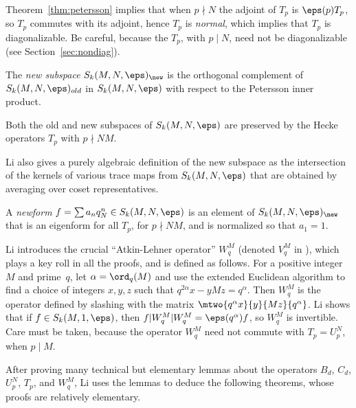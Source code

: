 \documentclass{report}
\begin{document}
\begin{remark}
Theorem~\ref{thm:petersson} implies that when $p\nmid N$ the adjoint of $T_p$
is $\eps(p) T_p$, so $T_p$ commutes with its adjoint, hence
$T_p$ is {\em normal}, which implies that $T_p$ is diagonalizable.
Be careful, because the $T_p$, with $p\mid N$, need not be diagonalizable
(see Section~\ref{sec:nondiag}).
\end{remark}

\begin{definition}
The {\em new subspace} $S_k(M,N,\eps)_{\new}$
is the orthogonal complement of $S_k(M,N,\eps)_{old}$ in $S_k(M,N,\eps)$ with respect
to the Petersson inner product.
\end{definition}
Both the old and new subspaces of $S_k(M,N,\eps)$ are preserved by
the Hecke operators $T_p$ with $p\nmid NM$.

\begin{remark}
Li \cite{winnie:newforms} also gives a purely algebraic definition of
the new subspace as the intersection of the kernels of various trace
maps from $S_k(M,N,\eps)$ that are obtained by averaging over
coset representatives.
\end{remark}

\begin{definition}[Newform]
A {\em newform} $f=\sum a_{n} q_N^n \in S_k(M,N,\eps)$ is an element of
$S_k(M,N,\eps)_{\new}$ that is an eigenform for all $T_p$, for
$p\nmid NM$, and is normalized so that $a_1 = 1$.
\end{definition}

Li introduces the crucial ``Atkin-Lehner operator'' $W_q^M$ (denoted
$V_q^M$ in \cite{winnie:newforms}), which plays a key
roll in all the proofs, and is defined as follows.  For a positive integer~$M$
and prime~$q$, let $\alpha=\ord_q(M)$ and use the extended Euclidean
algorithm to find a choice of integers $x,y,z$ such
that $q^{2\alpha}x - yMz = q^\alpha$.  Then $W_q^M$ is the operator defined
by slashing with the matrix $\mtwo{q^\alpha x}{y}{Mz}{q^\alpha}$.
Li shows that if $f\in S_k(M,1,\eps)$, then $f|W_q^M|W_q^M = \eps(q^\alpha) f$,
so $W_q^M$ is invertible.  Care must be taken, because
the operator $W_q^M$ need not commute with $T_p=U_p^N$, when $p\mid M$.

After proving many technical but elementary lemmas about the operators
$B_d$, $C_d$, $U_p^N$, $T_p$, and $W_q^M$, Li uses the lemmas to
deduce the following theorems, whose proofs are relatively elementary.
\end{document}

